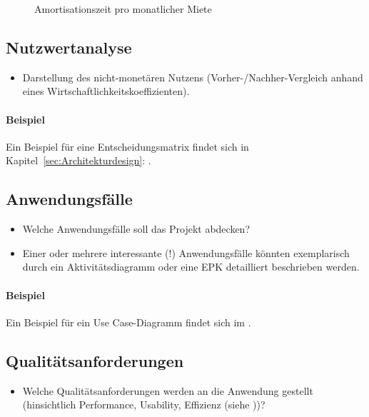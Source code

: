\begin{figure}[htb]
\centering
{}
\caption{Amortisationszeit pro monatlicher Miete}
\label{fig:AM}
\end{figure}

\subsection{Nutzwertanalyse}
\label{sec:Nutzwertanalyse}
\begin{itemize}
	\item Darstellung des nicht-monetären Nutzens (\zB Vorher-/Nachher-Vergleich anhand eines Wirtschaftlichkeitskoeffizienten). 
\end{itemize}

\paragraph{Beispiel}
Ein Beispiel für eine Entscheidungsmatrix findet sich in Kapitel~\ref{sec:Architekturdesign}: .


\subsection{Anwendungsfälle}
\label{sec:Anwendungsfaelle}
\begin{itemize}
	\item Welche Anwendungsfälle soll das Projekt abdecken?
	\item Einer oder mehrere interessante (!) Anwendungsfälle könnten exemplarisch durch ein Aktivitätsdiagramm oder eine \ac{EPK} detailliert beschrieben werden. 
\end{itemize}

\paragraph{Beispiel}
Ein Beispiel für ein Use Case-Diagramm findet sich im .


\subsection{Qualitätsanforderungen}
\label{sec:Qualitaetsanforderungen}
\begin{itemize}
	\item Welche Qualitätsanforderungen werden an die Anwendung gestellt (\zB hinsichtlich Performance, Usability, Effizienz \etc (siehe \citet{ISO9126}))?
\end{itemize}


